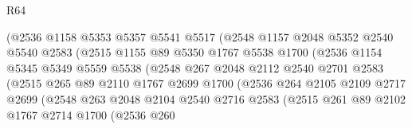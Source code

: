 \begin{lexlean}{R64}
\begin{coremodule}
                          (@2536
                            @1158
                            @5353
                            @5357
                            @5541
                            @5517
                            (@2548
                              @1157
                              @2048
                              @5352
                              @2540
                              @5540
                              @2583
                              (@2515
                                @1155
                                @89
                                @5350
                                @1767
                                @5538
                                @1700
                                (@2536
                                  @1154
                                  @5345
                                  @5349
                                  @5559
                                  @5538
                                  (@2548
                                    @267
                                    @2048
                                    @2112
                                    @2540
                                    @2701
                                    @2583
                                    (@2515
                                      @265
                                      @89
                                      @2110
                                      @1767
                                      @2699
                                      @1700
                                      (@2536
                                        @264
                                        @2105
                                        @2109
                                        @2717
                                        @2699
                                        (@2548
                                          @263
                                          @2048
                                          @2104
                                          @2540
                                          @2716
                                          @2583
                                          (@2515
                                            @261
                                            @89
                                            @2102
                                            @1767
                                            @2714
                                            @1700
                                            (@2536
                                              @260

\end{coremodule}
\end{lexlean}
